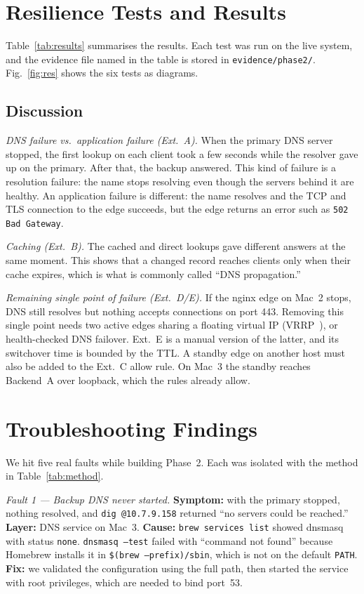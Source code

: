\documentclass[conference]{IEEEtran}
\begin{document}
\section{Resilience Tests and Results}
Table~\ref{tab:results} summarises the results. Each test was run on the live system, and the evidence file named in the table is stored in \texttt{evidence/phase2/}. Fig.~\ref{fig:res} shows the six tests as diagrams.



\subsection{Discussion}
\textit{DNS failure vs.\ application failure (Ext.~A).} When the primary DNS server stopped, the first lookup on each client took a few seconds while the resolver gave up on the primary. After that, the backup answered. This kind of failure is a resolution failure: the name stops resolving even though the servers behind it are healthy. An application failure is different: the name resolves and the TCP and TLS connection to the edge succeeds, but the edge returns an error such as \texttt{502 Bad Gateway}.

\textit{Caching (Ext.~B).} The cached and direct lookups gave different answers at the same moment. This shows that a changed record reaches clients only when their cache expires, which is what is commonly called ``DNS propagation.''

\textit{Remaining single point of failure (Ext.~D/E).} If the nginx edge on Mac~2 stops, DNS still resolves but nothing accepts connections on port 443. Removing this single point needs two active edges sharing a floating virtual IP (VRRP~\cite{rfc5798}), or health-checked DNS failover. Ext.~E is a manual version of the latter, and its switchover time is bounded by the TTL. A standby edge on another host must also be added to the Ext.~C allow rule. On Mac~3 the standby reaches Backend~A over loopback, which the rules already allow.

\section{Troubleshooting Findings}
We hit five real faults while building Phase~2. Each was isolated with the method in Table~\ref{tab:method}.

\textit{Fault 1 --- Backup DNS never started.}
\textbf{Symptom:} with the primary stopped, nothing resolved, and \texttt{dig @10.7.9.158} returned ``no servers could be reached.''
\textbf{Layer:} DNS service on Mac~3.
\textbf{Cause:} \texttt{brew services list} showed dnsmasq with status \texttt{none}. \texttt{dnsmasq --test} failed with ``command not found'' because Homebrew installs it in \texttt{\$(brew --prefix)/sbin}, which is not on the default \texttt{PATH}.
\textbf{Fix:} we validated the configuration using the full path, then started the service with root privileges, which are needed to bind port~53.
\end{document}
